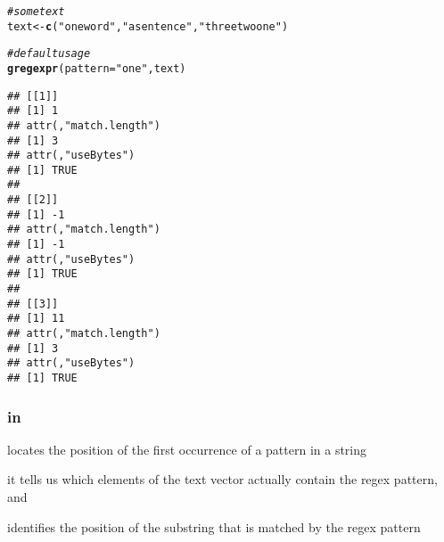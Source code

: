 \documentclass[12pt]{beamer}\usepackage[]{graphicx}\usepackage[]{color}
\makeatletter
\newcommand{\hlstr}[1]{\textcolor[rgb]{0.192,0.494,0.8}{#1}}%
\newcommand{\hlcom}[1]{\textcolor[rgb]{0.678,0.584,0.686}{\textit{#1}}}%
\newcommand{\hlstd}[1]{\textcolor[rgb]{0.345,0.345,0.345}{#1}}%
\newcommand{\hlkwb}[1]{\textcolor[rgb]{0.69,0.353,0.396}{#1}}%
\newcommand{\hlkwc}[1]{\textcolor[rgb]{0.333,0.667,0.333}{#1}}%
\newcommand{\hlkwd}[1]{\textcolor[rgb]{0.737,0.353,0.396}{\textbf{#1}}}%
\newenvironment{kframe}{%
 \def\at@end@of@kframe{}%
 \ifinner\ifhmode%
  \def\at@end@of@kframe{\end{minipage}}%
  \begin{minipage}{\columnwidth}%
 \fi\fi%
 \def\FrameCommand##1{\hskip\@totalleftmargin \hskip-\fboxsep
 \colorbox{shadecolor}{##1}\hskip-\fboxsep
     \hskip-\linewidth \hskip-\@totalleftmargin \hskip\columnwidth}%
 \MakeFramed {\advance\hsize-\width
   \@totalleftmargin\z@ \linewidth\hsize
   \@setminipage}}%
 {\par\unskip\endMakeFramed%
 \at@end@of@kframe}
\newenvironment{knitrout}{}{} %
\makeatother
\begin{document}
\begin{frame}[fragile]
\frametitle{}

\begin{knitrout}\tiny
{}\color{fgcolor}\begin{kframe}
\begin{alltt}
\hlcom{# some text}
\hlstd{text} \hlkwb{<-} \hlkwd{c}\hlstd{(}\hlstr{"one word"}\hlstd{,} \hlstr{"a sentence"}\hlstd{,} \hlstr{"three two one"}\hlstd{)}

\hlcom{# default usage}
\hlkwd{gregexpr}\hlstd{(}\hlkwc{pattern} \hlstd{=} \hlstr{"one"}\hlstd{, text)}
\end{alltt}
\begin{verbatim}
## [[1]]
## [1] 1
## attr(,"match.length")
## [1] 3
## attr(,"useBytes")
## [1] TRUE
## 
## [[2]]
## [1] -1
## attr(,"match.length")
## [1] -1
## attr(,"useBytes")
## [1] TRUE
## 
## [[3]]
## [1] 11
## attr(,"match.length")
## [1] 3
## attr(,"useBytes")
## [1] TRUE
\end{verbatim}
\end{kframe}
\end{knitrout}

\end{frame}


\begin{frame}[fragile]
\frametitle{ in }

\bi
  \item {} locates the position of the first occurrence of a pattern in a string
  \item it tells us which elements of the text vector actually contain the regex pattern, and
 \item identifies the position of the substring that is matched by the regex pattern
\ei

\end{frame}

\end{document}
